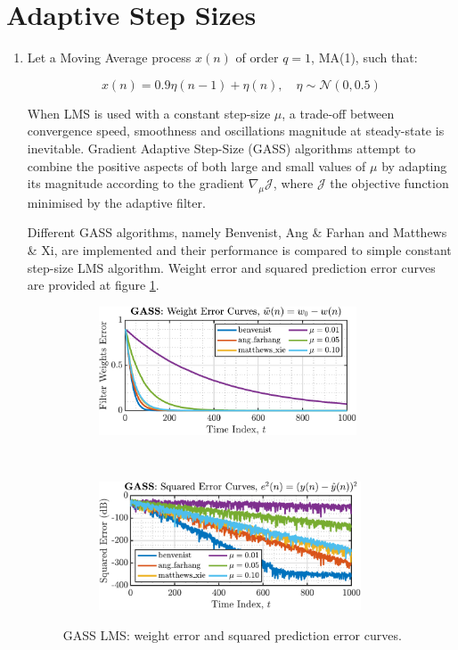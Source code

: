 \section{Adaptive Step Sizes}

\begin{enumerate}[label=\alph*), leftmargin=*]

\item
%

Let a Moving Average process $x(n)$ of order $q=1$, MA(1), such that:

\begin{equation}
    x(n) = 0.9 \eta(n - 1) + \eta(n), \quad \eta \sim \mathcal{N}(0, 0.5)
\end{equation}

When LMS is used with a constant step-size $\mu$, a trade-off between convergence speed, smoothness and oscillations magnitude at steady-state is inevitable.
Gradient Adaptive Step-Size (GASS) algorithms attempt to combine the positive aspects of both
large and small values of $\mu$ by adapting its magnitude according to the gradient $\nabla_{\mu} \mathcal{J}$, where $\mathcal{J}$ the objective function
minimised by the adaptive filter.

Different GASS algorithms, namely Benvenist, Ang \& Farhan and Matthews \& Xi, are implemented and their performance is compared to simple constant step-size LMS algorithm.
Weight error and squared prediction error curves are provided at figure \ref{fig:3_2_a}.

\begin{figure}[h]
    \centering
    \begin{subfigure}{0.49\textwidth}
        \centering
        \includegraphics[height=1.5in]{report/adaptive-signal-processing/adaptive-step-sizes/assets/a/weight_error_curves}
    \end{subfigure}
    ~
    \begin{subfigure}{0.49\textwidth}
        \centering
        \includegraphics[height=1.5in]{report/adaptive-signal-processing/adaptive-step-sizes/assets/a/squared_prediction_error}
    \end{subfigure}
    \caption{GASS LMS: weight error and squared prediction error curves.}
    \label{fig:3_2_a}
\end{figure}


\end{enumerate}
